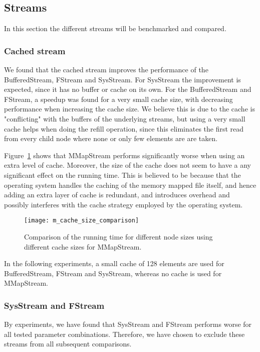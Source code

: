 \subsection{Streams}
In this section the different streams will be benchmarked and compared.

\subsubsection{Cached stream}
We found that the cached stream improves the performance of the BufferedStream, FStream and SysStream. For SysStream the improvement is expected, since it has no buffer or cache on its own. For the BufferedStream and FStream, a speedup was found for a very small cache size, with decreasing performance when increasing the cache size. We believe this is due to the cache is "conflicting" with the buffers of the underlying streams, but using a very small cache helps when doing the refill operation, since this eliminates the first read from every child node where none or only few elements are are taken.

Figure~\ref{fig:m-cache-size-comparison} shows that MMapStream performs significantly worse when using an extra level of cache. Moreover, the size of the cache does not seem to have a any significant effect on the running time. This is believed to be because that the operating system handles the caching of the memory mapped file itself, and hence adding an extra layer of cache is redundant, and introduces overhead and possibly interferes with the cache strategy employed by the operating system.

\begin{figure}
  \centering
  \texttt{[image: m\_cache\_size\_comparison]}
  \caption{Comparison of the running time for different node sizes using different cache sizes for MMapStream.}
  \label{fig:m-cache-size-comparison}
\end{figure}

In the following experiments, a small cache of 128 elements are used for BufferedStream, FStream and SysStream, whereas no cache is used for MMapStream.

\subsubsection{SysStream and FStream}
By experiments, we have found that SysStream and FStream performs worse for all tested parameter combinations. Therefore, we have chosen to exclude these streams from all subsequent comparisons.

